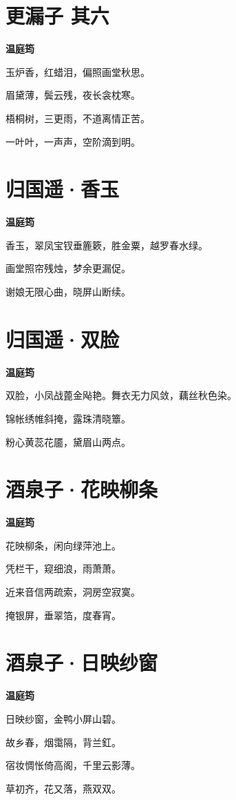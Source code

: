 \documentclass[12pt,a4paper]{ctexbook}
\begin{document}
\section{更漏子 其六}
\textbf{温庭筠}\par\vspace{0.5em}
玉炉香，红蜡泪，偏照画堂秋思。\par
眉黛薄，鬓云残，夜长衾枕寒。\par
梧桐树，三更雨，不道离情正苦。\par
一叶叶，一声声，空阶滴到明。\par

\section{归国遥·香玉}
\textbf{温庭筠}\par\vspace{0.5em}
香玉，翠凤宝钗垂簏簌，胜金粟，越罗春水绿。\par
画堂照帘残烛，梦余更漏促。\par
谢娘无限心曲，晓屏山断续。\par

\section{归国遥·双脸}
\textbf{温庭筠}\par\vspace{0.5em}
双脸，小凤战蓖金飐艳。舞衣无力风敛，藕丝秋色染。\par
锦帐绣帷斜掩，露珠清晓簟。\par
粉心黄蕊花靥，黛眉山两点。\par

\section{酒泉子·花映柳条}
\textbf{温庭筠}\par\vspace{0.5em}
花映柳条，闲向绿萍池上。\par
凭栏干，窥细浪，雨萧萧。\par
近来音信两疏索，洞房空寂寞。\par
掩银屏，垂翠箔，度春宵。\par

\section{酒泉子·日映纱窗}
\textbf{温庭筠}\par\vspace{0.5em}
日映纱窗，金鸭小屏山碧。\par
故乡春，烟霭隔，背兰釭。\par
宿妆惆怅倚高阁，千里云影薄。\par
草初齐，花又落，燕双双。\par
\end{document}
